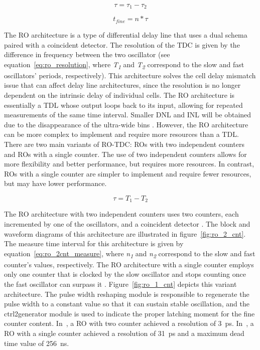 \begin{equation}
	\tau = \tau_{1} - \tau_{2}
	\label{eq:2tdl_resolution}
\end{equation}

\begin{equation}
	t_{fine} = n * \tau
	\label{eq:2tdl_measure}
\end{equation}

The \gls{RO} architecture is a type of differential delay line that uses a dual  schema paired with a coincident detector. The resolution of the \gls{TDC} is given by the difference in frequency between the two oscillator (see equation~\ref{eq:ro_resolution}, where \textit{T\textsubscript{1}} and \textit{T\textsubscript{2}} correspond to the slow and fast oscillators' periods, respectively). This architecture solves the cell delay mismatch issue that can affect delay line architectures, since the resolution is no longer dependent on the intrinsic delay of individual cells. The \gls{RO} architecture is essentially a \gls{TDL} whose output loops back to its input, allowing for repeated measurements of the same time interval. Smaller \gls{DNL} and \gls{INL} will be obtained due to the disappearance of the ultra-wide bins \cite{ro_bi_interpolation}. However, the \gls{RO} architecture can be more complex to implement and require more resources than a \gls{TDL}. There are two main variants of \gls{RO}-\gls{TDC}: \glspl{RO} with two independent counters and \glspl{RO} with a single counter. The use of two independent counters allows for more flexibility and better performance, but requires more resources. In contrast, \glspl{RO} with a single counter are simpler to implement and require fewer resources, but may have lower performance.

\begin{equation}
	\tau = T_{1} - T_{2}
	\label{eq:ro_resolution}
\end{equation}

The \gls{RO} architecture with two independent counters uses two counters, each incremented by one of the oscillators, and a coincident detector \citep{ro_2_counter}. The block and waveform diagrams of this architecture are illustrated in figure~\ref{fig:ro_2_cnt}. The measure time interval for this architecture is given by equation~\ref{eq:ro_2cnt_measure}, where \textit{n\textsubscript{1}} and \textit{n\textsubscript{2}} correspond to the slow and fast counter's values, respectively. The \gls{RO} architecture with a single counter employs only one counter that is clocked by the slow oscillator and stops counting once the fast oscillator can surpass it \citep{ro_1_counter}. Figure~\ref{fig:ro_1_cnt} depicts this variant architecture. The pulse width reshaping module is responsible to regenerate the pulse width to a constant value so that it can sustain stable oscillation, and the ctrl2generator module is used to indicate the proper latching moment for the fine counter content. In~\citep{ro_2_counter}, a \gls{RO} with two counter achieved a resolution of 3~ps. In~\citep{2tdl_bd}, a \gls{RO} with a single counter achieved a resolution of 31~ps and a maximum dead time value of 256~ns.


